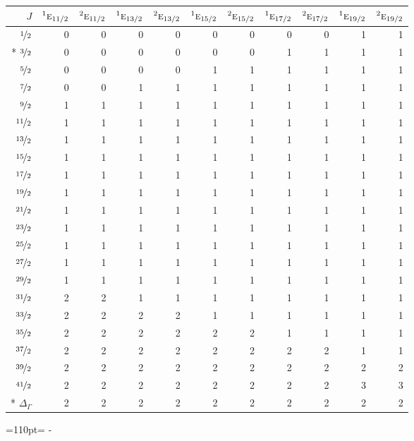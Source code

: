 \documentclass[10pt,a4paper]{article}
\makeatletter
\def\grouprule#1#2{\noalign{\marks\LTgroupmarks{\the\belowrulesep}\nobreak\vskip#1%
  \vskip\aboverulesep}\multispan\LT@cols\unskip{\leaders\hrule\@height#2\hfill\kern\z@}\cr
  \noalign{\penalty\LTrulebreak\vskip\belowrulesep\global\@lastruleclass\z@}}
\newcommand{\needspace}[1]{\par\penalty-100\begingroup\dimen0=#1\relax\dimen2=\pagegoal
  \advance\dimen2-\pagetotal\ifdim\dimen0>\dimen2\relax\ifdim\dimen2>0pt\vfil\break\fi\fi
  \endgroup}
\numberwithin{equation}{section}
\newcommand{\irr}[1]{\text{\normalfont\scshape #1}}
\newcommand{\conjpair}[1]{{}^{#1}}
\makeatother
\begin{document}
{\small\begin{longtable}{@{}rrrrrrrrrrr@{}}\toprule
$J$ & $\conjpair{1}\irr{e}_{11/2}$ & $\conjpair{2}\irr{e}_{11/2}$ & $\conjpair{1}\irr{e}_{13/2}$ & $\conjpair{2}\irr{e}_{13/2}$ & $\conjpair{1}\irr{e}_{15/2}$ & $\conjpair{2}\irr{e}_{15/2}$ & $\conjpair{1}\irr{e}_{17/2}$ & $\conjpair{2}\irr{e}_{17/2}$ & $\conjpair{1}\irr{e}_{19/2}$ & $\conjpair{2}\irr{e}_{19/2}$\\\midrule\endhead
\bottomrule\endfoot\endlastfoot
$\nicefrac{1}{2}$ & 0 & 0 & 0 & 0 & 0 & 0 & 0 & 0 & 1 & 1\\*
$\nicefrac{3}{2}$ & 0 & 0 & 0 & 0 & 0 & 0 & 1 & 1 & 1 & 1\\
$\nicefrac{5}{2}$ & 0 & 0 & 0 & 0 & 1 & 1 & 1 & 1 & 1 & 1\\
$\nicefrac{7}{2}$ & 0 & 0 & 1 & 1 & 1 & 1 & 1 & 1 & 1 & 1\\
$\nicefrac{9}{2}$ & 1 & 1 & 1 & 1 & 1 & 1 & 1 & 1 & 1 & 1\\
$\nicefrac{11}{2}$ & 1 & 1 & 1 & 1 & 1 & 1 & 1 & 1 & 1 & 1\\
$\nicefrac{13}{2}$ & 1 & 1 & 1 & 1 & 1 & 1 & 1 & 1 & 1 & 1\\
$\nicefrac{15}{2}$ & 1 & 1 & 1 & 1 & 1 & 1 & 1 & 1 & 1 & 1\\
$\nicefrac{17}{2}$ & 1 & 1 & 1 & 1 & 1 & 1 & 1 & 1 & 1 & 1\\
$\nicefrac{19}{2}$ & 1 & 1 & 1 & 1 & 1 & 1 & 1 & 1 & 1 & 1\\
$\nicefrac{21}{2}$ & 1 & 1 & 1 & 1 & 1 & 1 & 1 & 1 & 1 & 1\\
$\nicefrac{23}{2}$ & 1 & 1 & 1 & 1 & 1 & 1 & 1 & 1 & 1 & 1\\
$\nicefrac{25}{2}$ & 1 & 1 & 1 & 1 & 1 & 1 & 1 & 1 & 1 & 1\\
$\nicefrac{27}{2}$ & 1 & 1 & 1 & 1 & 1 & 1 & 1 & 1 & 1 & 1\\
$\nicefrac{29}{2}$ & 1 & 1 & 1 & 1 & 1 & 1 & 1 & 1 & 1 & 1\\
$\nicefrac{31}{2}$ & 2 & 2 & 1 & 1 & 1 & 1 & 1 & 1 & 1 & 1\\
$\nicefrac{33}{2}$ & 2 & 2 & 2 & 2 & 1 & 1 & 1 & 1 & 1 & 1\\
$\nicefrac{35}{2}$ & 2 & 2 & 2 & 2 & 2 & 2 & 1 & 1 & 1 & 1\\
$\nicefrac{37}{2}$ & 2 & 2 & 2 & 2 & 2 & 2 & 2 & 2 & 1 & 1\\
$\nicefrac{39}{2}$ & 2 & 2 & 2 & 2 & 2 & 2 & 2 & 2 & 2 & 2\\
$\nicefrac{41}{2}$ & 2 & 2 & 2 & 2 & 2 & 2 & 2 & 2 & 3 & 3\\*
\grouprule{0pt}{\lightrulewidth} $\Delta_\Gamma$ & 2 & 2 & 2 & 2 & 2 & 2 & 2 & 2 & 2 & 2\\
\bottomrule\end{longtable}}
\needspace{110pt}
\end{document}

